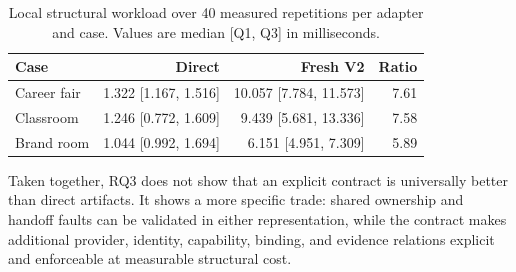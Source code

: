 \begin{table}[t]
  \caption{Local structural workload over 40 measured repetitions per adapter
  and case.  Values are median [Q1, Q3] in milliseconds.}
  \label{tab:runtime-cost}
  \small
  \begin{tabular}{@{}lrrr@{}}
    \toprule
    Case & Direct & Fresh V2 & Ratio \\
    \midrule
    Career fair & 1.322 [1.167, 1.516] & 10.057 [7.784, 11.573] & 7.61 \\
    Classroom & 1.246 [0.772, 1.609] & 9.439 [5.681, 13.336] & 7.58 \\
    Brand room & 1.044 [0.992, 1.694] & 6.151 [4.951, 7.309] & 5.89 \\
    \bottomrule
  \end{tabular}
\end{table}

Taken together, RQ3 does not show that an explicit contract is universally
better than direct artifacts.  It shows a more specific trade: shared
ownership and handoff faults can be validated in either representation, while
the contract makes additional provider, identity, capability, binding, and
evidence relations explicit and enforceable at measurable structural cost.
